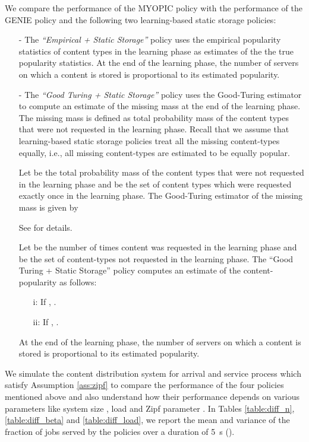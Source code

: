 \documentclass[10pt, conference, letterpaper]{IEEEtran}
\begin{document}
We compare the performance of the MYOPIC policy with the performance of the GENIE policy and the following two learning-based static storage policies:
\begin{itemize}
	\item [-] The \emph{``Empirical + Static Storage''} policy uses the empirical popularity statistics of content types in the learning phase as estimates of the the true popularity statistics. At the end of the learning phase, the number of servers on which a content is stored is proportional to its estimated popularity.
	\item [-] The \emph{``Good Turing + Static Storage''} policy uses the
	Good-Turing estimator \cite{MS00} to compute an estimate of the
	missing mass at the end of the learning phase. The missing mass is
	defined as total probability mass of the content types that were not
	requested in the learning phase. Recall that we assume that learning-based static storage policies treat all the missing content-types equally, i.e., all missing content-types are estimated to be equally popular.
	
	Let  be the total probability mass of the content types that were not requested in the learning
	phase and  be the set of content types which were requested
	exactly once in the learning phase. The Good-Turing estimator of
	the missing mass  is given by
	
	See \cite{MS00} for details.
	
	Let  be the number of times content  was requested in the
	learning phase and  be the set of
	content-types not requested in the learning phase. The ``Good Turing + Static Storage'' policy computes an estimate of the content-popularity as follows:
	\begin{itemize}
		\item[i:] If , .
		\item[ii:] If , .
	\end{itemize}
	At the end of the learning phase, the number of servers on which a content is stored is proportional to its estimated popularity.
\end{itemize}

We simulate the content distribution system for arrival and service process which satisfy Assumption \ref{ass:zipf} to compare the performance of the four policies mentioned above and also understand how their performance depends on various parameters like system size , load  and Zipf parameter . In Tables \ref{table:diff_n}, \ref{table:diff_beta} and \ref{table:diff_load}, we report the mean and variance of the fraction of jobs served by the policies over a duration of 5~s ().
\end{document}
